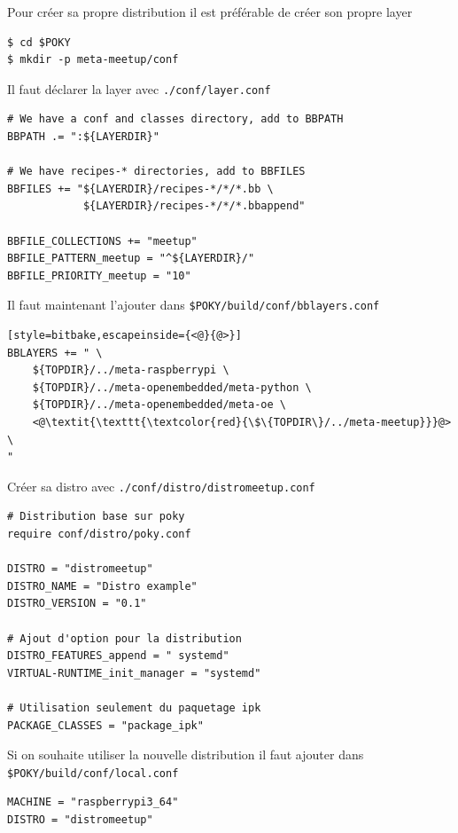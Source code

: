 \documentclass[compress]{smilebeamer}
\begin{document}
\begin{frame}[fragile]
Pour créer sa propre distribution il est préférable de créer son propre layer
\begin{lstlisting}[style=shell]
$ cd $POKY
$ mkdir -p meta-meetup/conf
\end{lstlisting}

Il faut déclarer la layer avec \texttt{./conf/layer.conf}
\begin{lstlisting}[style=bitbake]
# We have a conf and classes directory, add to BBPATH
BBPATH .= ":${LAYERDIR}"

# We have recipes-* directories, add to BBFILES
BBFILES += "${LAYERDIR}/recipes-*/*/*.bb \
            ${LAYERDIR}/recipes-*/*/*.bbappend"

BBFILE_COLLECTIONS += "meetup"
BBFILE_PATTERN_meetup = "^${LAYERDIR}/"
BBFILE_PRIORITY_meetup = "10"
\end{lstlisting}
\end{frame}

\begin{frame}[fragile]
Il faut maintenant l'ajouter dans \texttt{\$POKY/build/conf/bblayers.conf}
\begin{lstlisting}[style=bitbake,escapeinside={<@}{@>}]
BBLAYERS += " \
    ${TOPDIR}/../meta-raspberrypi \
    ${TOPDIR}/../meta-openembedded/meta-python \
    ${TOPDIR}/../meta-openembedded/meta-oe \
    <@\textit{\texttt{\textcolor{red}{\$\{TOPDIR\}/../meta-meetup}}}@> \
"
\end{lstlisting}
\end{frame}

\begin{frame}[fragile]
Créer sa distro avec \texttt{./conf/distro/distromeetup.conf}
\begin{lstlisting}[style=bitbake]
# Distribution base sur poky
require conf/distro/poky.conf

DISTRO = "distromeetup"
DISTRO_NAME = "Distro example"
DISTRO_VERSION = "0.1"

# Ajout d'option pour la distribution
DISTRO_FEATURES_append = " systemd"
VIRTUAL-RUNTIME_init_manager = "systemd"

# Utilisation seulement du paquetage ipk
PACKAGE_CLASSES = "package_ipk"
\end{lstlisting}

Si on souhaite utiliser la nouvelle distribution il faut ajouter dans \texttt{\$POKY/build/conf/local.conf}
\begin{lstlisting}[style=bitbake]
MACHINE = "raspberrypi3_64"
DISTRO = "distromeetup"
\end{lstlisting}
\end{frame}
\end{document}
